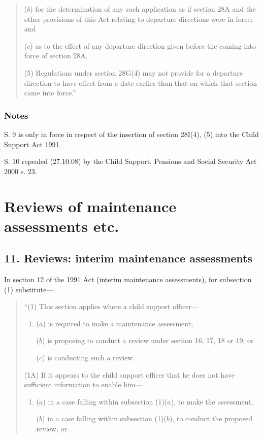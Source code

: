 \documentclass[a4paper]{article}
\newcommand\amendment[1]{\subsubsection*{Notes}{\itshape\frenchspacing\footnotesize #1 \par}}
\begin{document}
{\begin{quotation}
\begin{enumerate}
($b$) for the determination of any such application as if section 28A and the other provisions of this Act relating to departure directions were in force; and

($c$) as to the effect of any departure direction given before the coming into force of section 28A.
\end{enumerate}

(5) Regulations under section 28G(4) may not provide for a departure direction to have effect from a date earlier than that on which that section came into force.”
\end{quotation}

\amendment{

S. 9 is only in force in respect of the insertion of section 28I(4), (5) into the Child Support Act 1991.

\medskip

S. 10 repealed (27.10.08) by the Child Support, Pensions and Social Security Act 2000 s. 23.
}

\section{Reviews of maintenance assessments etc.}

\subsection{11. Reviews: interim maintenance assessments}

In section 12 of the 1991 Act (interim maintenance assessments), for subsection (1) substitute—
\begin{quotation}
“(1) This section applies where a child support officer—
\begin{enumerate}\item[]
($a$) is required to make a maintenance assessment;

($b$) is proposing to conduct a review under section 16, 17, 18 or 19; or

($c$) is conducting such a review.
\end{enumerate}

(1A) If it appears to the child support officer that he does not have sufficient information to enable him—
\begin{enumerate}\item[]
($a$) in a case falling within subsection (1)($a$), to make the assessment,

($b$) in a case falling within subsection (1)($b$), to conduct the proposed review, or


\end{enumerate}
\end{quotation}}
\end{document}
